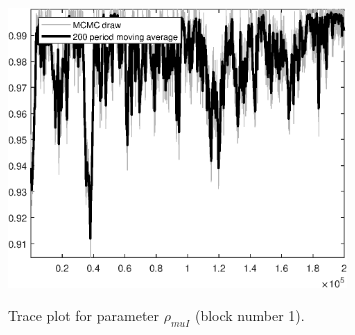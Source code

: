 \begin{figure}[H]
\centering
  \includegraphics[width=0.8\textwidth]{BRS_sectoral_rest/graphs/TracePlot_rho_muI_blck_1}\\
    \caption{Trace plot for parameter ${\rho_{muI}}$ (block number 1).}
\end{figure}
